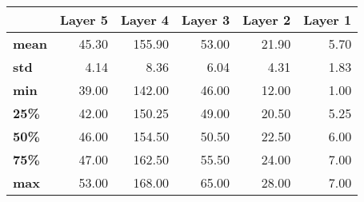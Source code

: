 \begin{tabular}{lrrrrr}
\toprule
{} &  Layer 5 &  Layer 4 &  Layer 3 &  Layer 2 &  Layer 1 \\
\midrule
\textbf{mean} &    45.30 &   155.90 &    53.00 &    21.90 &     5.70 \\
\textbf{std } &     4.14 &     8.36 &     6.04 &     4.31 &     1.83 \\
\textbf{min } &    39.00 &   142.00 &    46.00 &    12.00 &     1.00 \\
\textbf{25\% } &    42.00 &   150.25 &    49.00 &    20.50 &     5.25 \\
\textbf{50\% } &    46.00 &   154.50 &    50.50 &    22.50 &     6.00 \\
\textbf{75\% } &    47.00 &   162.50 &    55.50 &    24.00 &     7.00 \\
\textbf{max } &    53.00 &   168.00 &    65.00 &    28.00 &     7.00 \\
\bottomrule
\end{tabular}
